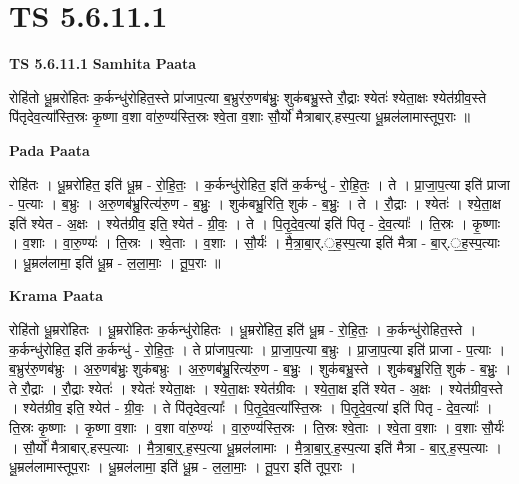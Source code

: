 \documentclass[17pt]{extarticle}
\begin{document}
\section{ TS 5.6.11.1 }

\textbf{TS 5.6.11.1 } \newline
\textbf{Samhita Paata} \newline

रोहि॑तो धू॒म्ररो॑हितः क॒र्कन्धु॑रोहित॒स्ते प्रा॑जाप॒त्या ब॒भ्रुर॑रु॒णब॑भ्रुः॒ शुक॑बभ्रु॒स्ते रौ॒द्राः श्येतः॑ श्येता॒क्षः श्येत॑ग्रीव॒स्ते पि॑तृदेव॒त्या᳚स्ति॒स्रः कृ॒ष्णा व॒शा वा॑रु॒ण्य॑स्ति॒स्रः श्वे॒ता व॒शाः सौ॒र्यो॑ मैत्राबार्.हस्प॒त्या धू॒म्रल॑लामास्तूप॒राः ॥ \newline

\textbf{Pada Paata} \newline

रोहि॑तः । धू॒म्ररो॑हित॒ इति॑ धू॒म्र - रो॒हि॒तः॒ । क॒र्कन्धु॑रोहित॒ इति॑ क॒र्कन्धु॑ - रो॒हि॒तः॒ । ते । प्रा॒जा॒प॒त्या इति॑ प्राजा - प॒त्याः । ब॒भ्रुः । अ॒रु॒णब॑भ्रु॒रित्य॑रु॒ण - ब॒भ्रुः॒ । शुक॑बभ्रु॒रिति॒ शुक॑ - ब॒भ्रुः॒ । ते । रौ॒द्राः । श्येतः॑ । श्ये॒ता॒क्ष इति॑ श्येत - अ॒क्षः । श्येत॑ग्रीव॒ इति॒ श्येत॑ - ग्री॒वः॒ । ते । पि॒तृ॒दे॒व॒त्या॑ इति॑ पितृ - दे॒व॒त्याः᳚ । ति॒स्रः । कृ॒ष्णाः । व॒शाः । वा॒रु॒ण्यः॑ । ति॒स्रः । श्वे॒ताः । व॒शाः । सौ॒र्यः॑ । मै॒त्रा॒बा॒र्.॒ह॒स्प॒त्या इति॑ मैत्रा - बा॒र्.॒ह॒स्प॒त्याः । धू॒म्रल॑लामा॒ इति॑ धू॒म्र - ल॒ला॒माः॒ । तू॒प॒राः ॥  \newline


\textbf{Krama Paata} \newline

रोहि॑तो धू॒म्ररो॑हितः । धू॒म्ररो॑हितः क॒र्कन्धु॑रोहितः । धू॒म्ररो॑हित॒ इति॑ धू॒म्र - रो॒हि॒तः॒ । क॒र्कन्धु॑रोहित॒स्ते । क॒र्कन्धु॑रोहित॒ इति॑ क॒र्कन्धु॑ - रो॒हि॒तः॒ । ते प्रा॑जाप॒त्याः । प्रा॒जा॒प॒त्या ब॒भ्रुः । प्रा॒जा॒प॒त्या इति॑ प्राजा - प॒त्याः । ब॒भ्रुर॑रु॒णब॑भ्रुः । अ॒रु॒णब॑भ्रुः॒ शुक॑बभ्रुः । अ॒रु॒णब॑भ्रु॒रित्य॑रु॒ण - ब॒भ्रुः॒ । शुक॑बभ्रु॒स्ते । शुक॑बभ्रु॒रिति॒ शुक॑ - ब॒भ्रुः॒ । ते रौ॒द्राः । रौ॒द्राः श्येतः॑ । श्येतः॑ श्येता॒क्षः । श्ये॒ता॒क्षः श्येत॑ग्रीवः । श्ये॒ता॒क्ष इति॑ श्येत - अ॒क्षः । श्येत॑ग्रीव॒स्ते । श्येत॑ग्रीव॒ इति॒ श्येत॑ - ग्री॒वः॒ । ते पि॑तृदेव॒त्याः᳚ । पि॒तृ॒दे॒व॒त्या᳚स्ति॒स्रः । पि॒तृ॒दे॒व॒त्या॑ इति॑ पितृ - दे॒व॒त्याः᳚ । ति॒स्रः कृ॒ष्णाः । कृ॒ष्णा व॒शाः । व॒शा वा॑रु॒ण्यः॑ । वा॒रु॒ण्य॑स्ति॒स्रः । ति॒स्रः श्वे॒ताः । श्वे॒ता व॒शाः । व॒शाः सौ॒र्यः॑ । सौ॒र्यो॑ मैत्राबार्.हस्प॒त्याः । मै॒त्रा॒बा॒र्॒.ह॒स्प॒त्या धू॒म्रल॑लामाः । मै॒त्रा॒बा॒र्॒.ह॒स्प॒त्या इति॑ मैत्रा - बा॒र्॒.ह॒स्प॒त्याः । धू॒म्रल॑लामास्तूप॒राः । धू॒म्रल॑लामा॒ इति॑ धू॒म्र - ल॒ला॒माः॒ । तू॒प॒रा इति॑ तूप॒राः । \newline
\end{document}
